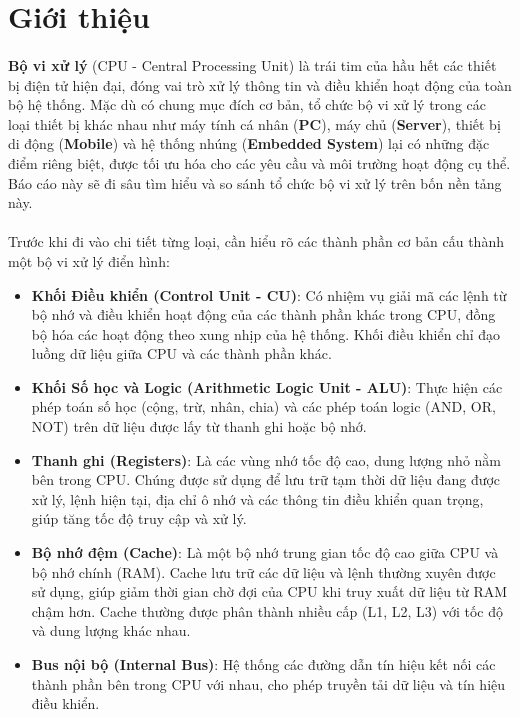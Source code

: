 \newpage
\section{Giới thiệu}

\paragraph{}{\textbf{Bộ vi xử lý} \cite{ibm_cpu} (CPU - Central Processing Unit) là trái tim của hầu hết các thiết bị điện tử hiện đại, đóng vai trò xử lý thông tin và điều khiển hoạt động của toàn bộ hệ thống. Mặc dù có chung mục đích cơ bản, tổ chức bộ vi xử lý trong các loại thiết bị khác nhau như máy tính cá nhân (\textbf{PC}), máy chủ (\textbf{Server}), thiết bị di động (\textbf{Mobile}) và hệ thống nhúng (\textbf{Embedded System}) lại có những đặc điểm riêng biệt, được tối ưu hóa cho các yêu cầu và môi trường hoạt động cụ thể. Báo cáo này sẽ đi sâu tìm hiểu và so sánh tổ chức bộ vi xử lý trên bốn nền tảng này.}

\paragraph{}{Trước khi đi vào chi tiết từng loại, cần hiểu rõ các thành phần cơ bản cấu thành một bộ vi xử lý điển hình:}

\begin{itemize}
    \item \textbf{Khối Điều khiển (Control Unit - CU)}: Có nhiệm vụ giải mã các lệnh từ bộ nhớ và điều khiển hoạt động của các thành phần khác trong CPU, đồng bộ hóa các hoạt động theo xung nhịp của hệ thống. Khối điều khiển chỉ đạo luồng dữ liệu giữa CPU và các thành phần khác.
    \item \textbf{Khối Số học và Logic (Arithmetic Logic Unit - ALU)}: Thực hiện các phép toán số học (cộng, trừ, nhân, chia) và các phép toán logic (AND, OR, NOT) trên dữ liệu được lấy từ thanh ghi hoặc bộ nhớ.
    \item \textbf{Thanh ghi (Registers)}: Là các vùng nhớ tốc độ cao, dung lượng nhỏ nằm bên trong CPU. Chúng được sử dụng để lưu trữ tạm thời dữ liệu đang được xử lý, lệnh hiện tại, địa chỉ ô nhớ và các thông tin điều khiển quan trọng, giúp tăng tốc độ truy cập và xử lý.
    \item \textbf{Bộ nhớ đệm (Cache)}: Là một bộ nhớ trung gian tốc độ cao giữa CPU và bộ nhớ chính (RAM). Cache lưu trữ các dữ liệu và lệnh thường xuyên được sử dụng, giúp giảm thời gian chờ đợi của CPU khi truy xuất dữ liệu từ RAM chậm hơn. Cache thường được phân thành nhiều cấp (L1, L2, L3) với tốc độ và dung lượng khác nhau.
    \item \textbf{Bus nội bộ (Internal Bus)}: Hệ thống các đường dẫn tín hiệu kết nối các thành phần bên trong CPU với nhau, cho phép truyền tải dữ liệu và tín hiệu điều khiển.
\end{itemize}

